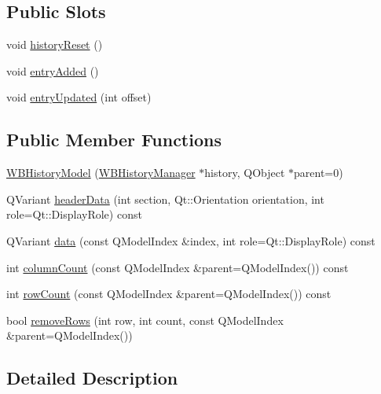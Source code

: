 \subsection*{Public Slots}
\begin{DoxyCompactItemize}
\item 
void \hyperlink{class_w_b_history_model_a756d78c9591f3804bcb0653451d285d9}{history\-Reset} ()
\item 
void \hyperlink{class_w_b_history_model_a1f0db156717f0eccbfda2058b5885aeb}{entry\-Added} ()
\item 
void \hyperlink{class_w_b_history_model_a2bf955c8d5195ee2d9d281e53ef89ea8}{entry\-Updated} (int offset)
\end{DoxyCompactItemize}
\subsection*{Public Member Functions}
\begin{DoxyCompactItemize}
\item 
\hyperlink{class_w_b_history_model_a0e5762776be2b33652171b81b7e52efe}{W\-B\-History\-Model} (\hyperlink{class_w_b_history_manager}{W\-B\-History\-Manager} $\ast$history, Q\-Object $\ast$parent=0)
\item 
Q\-Variant \hyperlink{class_w_b_history_model_a67599d7e32056287276197996be84084}{header\-Data} (int section, Qt\-::\-Orientation orientation, int role=Qt\-::\-Display\-Role) const 
\item 
Q\-Variant \hyperlink{class_w_b_history_model_a538a970592c893b38572801279e249a4}{data} (const Q\-Model\-Index \&index, int role=Qt\-::\-Display\-Role) const 
\item 
int \hyperlink{class_w_b_history_model_ac33fd2a53e6145f37ee02298edcedb77}{column\-Count} (const Q\-Model\-Index \&parent=Q\-Model\-Index()) const 
\item 
int \hyperlink{class_w_b_history_model_a761d669ec889b4e7815a3fea79c31b54}{row\-Count} (const Q\-Model\-Index \&parent=Q\-Model\-Index()) const 
\item 
bool \hyperlink{class_w_b_history_model_a791836de2c93231a2eb7d5b4ae355405}{remove\-Rows} (int row, int count, const Q\-Model\-Index \&parent=Q\-Model\-Index())
\end{DoxyCompactItemize}


\subsection{Detailed Description}


